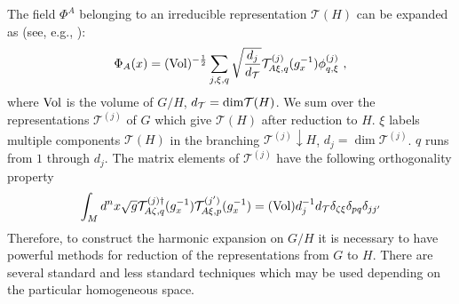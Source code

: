 The field $\Phi^A$ belonging to
an irreducible representation $\mathcal{T}(H)$ can be expanded as 
(see, e.g., \cite{Salam:1982xd}):
\begin{equation}
 \Phi_A (x)=({\rm Vol})^{-\frac 12} \sum_{j, \xi ,q}
\sqrt {\frac {d_j}{d_{\mathcal{T}}}} \mathcal{T}^{(j)}_{A\xi ,q}
(g_x^{-1}) \phi^{(j)}_{q,\xi }\ , \label{eq:(A.2)}
\end{equation}
where ${\rm Vol}$ is the volume of $G/H$, 
$d_{\mathcal{T}}={\rm dim}\mathcal{T}(H)$.
We sum over the representations $\mathcal{T}^{(j)}$ of $G$
which give $\mathcal{T}(H)$ after reduction to $H$. $\xi$ labels
multiple components  $\mathcal{T}(H)$ in the branching
$\mathcal{T}^{(j)}\downarrow H$, $d_j=\dim \mathcal{T}^{(j)}$. 
$q$ runs from $1$ through $d_j$. The matrix
elements of $\mathcal{T}^{(j)}$ have the following orthogonality
property
\begin{equation} \int_M d^nx\sqrt{g}
\mathcal{T}^{(j) \dag}_{A\zeta ,q} (g_x^{-1})
\mathcal{T}^{(j')}_{A\xi ,p} (g_x^{-1})
=({\rm Vol})d_j^{-1} d_{\mathcal{T}} \delta_{\zeta \xi} \delta_{p q}
\delta_{jj'} \label{eq:(A.3)}\end{equation}
Therefore, to construct the harmonic expansion on $G/H$ it is
necessary to have powerful methods for reduction of the representations 
from $G$ to $H$. There are several standard 
\cite{Barut:1977,Slansky:1981yr}
and less standard  \cite{Lyakhovsky:1989cr,Lyakhovsky:1991vv}
techniques which may be used depending on the particular
homogeneous space.

